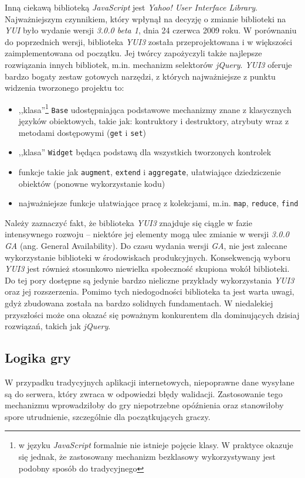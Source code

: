 \documentclass[a4paper,12pt]{article}
\begin{document}
Inną ciekawą biblioteką \emph{JavaScript} jest \emph{Yahoo! User
  Interface Library}. Najważniejszym czynnikiem, który wpłynął na
decyzję o zmianie biblioteki na \emph{YUI} było wydanie wersji
\emph{3.0.0 beta 1}, dnia 24 czerwca 2009 roku. W porównaniu do
poprzednich wersji, biblioteka \emph{YUI3} została przeprojektowana i
w większości zaimplementowana od początku. Jej twórcy zapożyczyli
także najlepsze rozwiązania innych bibliotek, m.in. mechanizm
selektorów \emph{jQuery}. \emph{YUI3} oferuje bardzo bogaty zestaw
gotowych narzędzi, z których najważniejsze z punktu widzenia
tworzonego projektu to:

\begin{itemize}
\item ,,klasa''\footnote{w języku \emph{JavaScript} formalnie nie
    istnieje pojęcie klasy. W praktyce okazuje się jednak, że
    zastosowany mechanizm bezklasowy wykorzystywany jest podobny
    sposób do tradycyjnego} \texttt{Base} udostępniająca podstawowe
  mechanizmy znane z klasycznych języków obiektowych, takie jak:
  kontruktory i destruktory, atrybuty wraz z metodami dostępowymi
  (\texttt{get} i \texttt{set})
\item ,,klasa'' \texttt{Widget} będąca podstawą dla wszystkich
  tworzonych kontrolek
\item funkcje takie jak \texttt{augment}, \texttt{extend} i
  \texttt{aggregate}, ułatwiające dziedziczenie obiektów (ponowne
  wykorzystanie kodu)
\item najważniejsze funkcje ułatwiające pracę z kolekcjami,
  m.in. \texttt{map}, \texttt{reduce}, \texttt{find}
\end{itemize}

Należy zaznaczyć fakt, że biblioteka \emph{YUI3} znajduje się ciągle w
fazie intensywnego rozwoju -- niektóre jej elementy mogą ulec zmianie
w wersji \emph{3.0.0 GA} (ang. General Availability). Do czasu wydania
wersji \emph{GA}, nie jest zalecane wykorzystanie biblioteki w
środowiskach produkcyjnych. Konsekwencją wyboru \emph{YUI3} jest
również stosunkowo niewielka społeczność skupiona wokół biblioteki. Do
tej pory dostępne są jedynie bardzo nieliczne przykłady wykorzystania
\emph{YUI3} oraz jej rozszerzenia. Pomimo tych niedogodności
biblioteka ta jest warta uwagi, gdyż zbudowana została na bardzo
solidnych fundamentach. W niedalekiej przyszłości może ona okazać się
poważnym konkurentem dla dominujących dzisiaj rozwiązań, takich jak
\emph{jQuery}.

\subsection{Logika gry}
W przypadku tradycyjnych aplikacji internetowych, niepoprawne dane
wysyłane są do serwera, który zwraca w odpowiedzi błędy
walidacji. Zastosowanie tego mechanizmu wprowadziłoby do gry
niepotrzebne opóźnienia oraz stanowiłoby spore utrudnienie,
szczególnie dla początkujących graczy.
\end{document}
